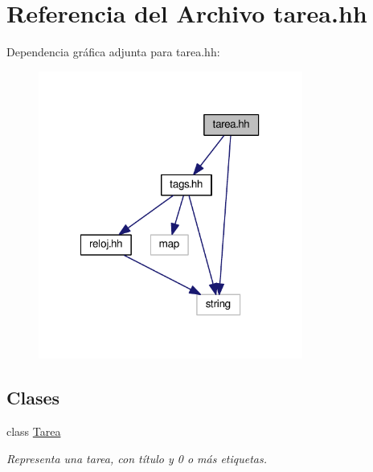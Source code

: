 \hypertarget{tarea_8hh}{\section{Referencia del Archivo tarea.\-hh}
\label{tarea_8hh}
}
Dependencia gráfica adjunta para tarea.\-hh\-:
\nopagebreak
\begin{figure}[H]
\begin{center}
\leavevmode
\includegraphics[width=246pt]{tarea_8hh__incl}
\end{center}
\end{figure}
\subsection*{Clases}
\begin{DoxyCompactItemize}
\item 
class \hyperlink{class_tarea}{Tarea}
\begin{DoxyCompactList}\small\item\em Representa una tarea, con título y 0 o más etiquetas. \end{DoxyCompactList}\end{DoxyCompactItemize}
